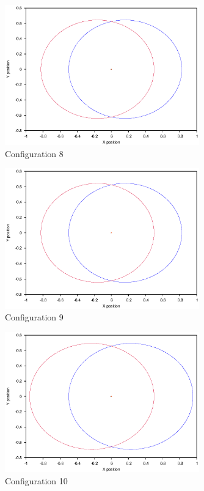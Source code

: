 \documentclass[a4paper,12pt]{article}
\begin{document}
\begin{figure}[H]
\centering
\includegraphics[width=0.75\textwidth]{./results/005-58-005-4/Orbit.eps}
\caption{Configuration 8}
\label{fig:config8}
\end{figure}
\begin{figure}[H]
\centering
\includegraphics[width=0.75\textwidth]{./results/005-58-005-35/Orbit.eps}
\caption{Configuration 9}
\label{fig:config9}
\end{figure}
\begin{figure}[H]
\centering
\includegraphics[width=0.75\textwidth]{./results/006-6-006-3/Orbit.eps}
\caption{Configuration 10}
\label{fig:config10}
\end{figure}
\end{document}
